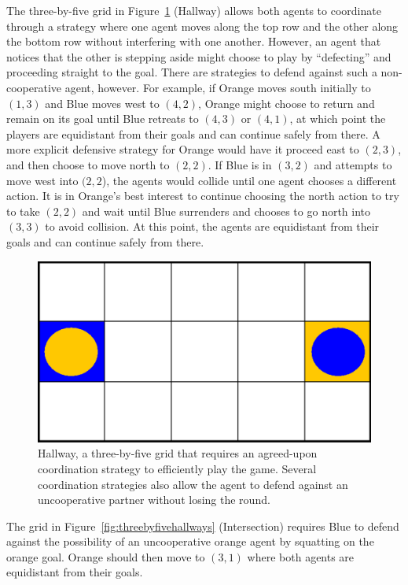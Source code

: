 \documentclass[letterpaper]{article}
\begin{document}
The three-by-five grid in Figure~\ref{fig:threebyfive} (Hallway)
allows both agents to coordinate through a strategy where one agent
moves along the top row and the other along the bottom row without
interfering with one another. However, an agent that notices that the
other is stepping aside might choose to play by ``defecting'' and
proceeding straight to the goal. There are strategies to defend
against such a non-cooperative agent, however. For example, if 
Orange moves south initially to $(1,3)$ and Blue moves west to
$(4,2)$, Orange might choose to return and remain on its
goal until Blue retreats to $(4,3)$ or $(4,1)$, at which
point the players are equidistant from their goals and can continue
safely from there. A more explicit defensive strategy for Orange would
have it proceed east to $(2,3)$, and then choose to move  
north to $(2,2)$. If Blue is in $(3,2)$ and attempts to move
west into $(2,2$), the agents would collide until one agent chooses a
different action. It is in Orange's best interest to continue choosing
the north action to try to take $(2,2)$ and wait until Blue surrenders
and chooses to go north into $(3,3)$ to avoid collision. At this
point, the agents are equidistant from their goals and can continue
safely from there. 

\begin{figure}
\centering
\includegraphics[width=0.71\columnwidth]{figures/threebyfive.png}
\caption{Hallway, a three-by-five grid that requires an
agreed-upon coordination strategy to efficiently play the
game. Several coordination strategies also allow the agent to defend
against an uncooperative partner without losing the round.}
\label{fig:threebyfive}
\end{figure}

The grid in Figure~\ref{fig:threebyfivehallways} (Intersection)
requires Blue to defend against the possibility of an
uncooperative orange agent by squatting on the orange goal. Orange
should then move to $(3,1)$ where both agents are equidistant
from their goals.
\end{document}
